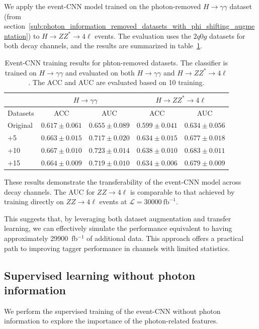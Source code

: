 \documentclass[12pt]{article}
\begin{document}
        We apply the event-CNN model trained on the photon-removed $H \to \gamma\gamma$ dataset (from section~\ref{sub:photon_information_removed_datasets_with_phi_shifting_augmentation}) to $H \to ZZ^* \to 4\ell$ events. The evaluation uses the $2q0g$ datasets for both decay channels, and the results are summarized in table~\ref{tab:CWoLa_event_CNN_training_results_100_jet_tagging_phi_aug_5_10_15_remove_photon_ZZ4l}.
        \begin{table}[htpb]
            \centering
            \caption{Event-CNN training results for phton-removed datasets. The classifier is trained on $H \to \gamma\gamma$ and evaluated on both $H \to \gamma\gamma$ and $H \to ZZ^* \to 4\ell$. The ACC and AUC are evaluated based on 10 training.}
            \label{tab:CWoLa_event_CNN_training_results_100_jet_tagging_phi_aug_5_10_15_remove_photon_ZZ4l}
            \begin{tabular}{l|cc|cc}
                         &\multicolumn{2}{c|}{$H\to\gamma\gamma$}&\multicolumn{2}{c}{$H\to ZZ^*\to4\ell$}\\ \hline
                Datasets & ACC               & AUC               & ACC               & AUC               \\ \hline
                Original & $0.617 \pm 0.061$ & $0.655 \pm 0.089$ & $0.599 \pm 0.041$ & $0.634 \pm 0.056$ \\
                +5       & $0.663 \pm 0.015$ & $0.717 \pm 0.020$ & $0.634 \pm 0.015$ & $0.677 \pm 0.018$ \\
                +10      & $0.667 \pm 0.010$ & $0.723 \pm 0.014$ & $0.638 \pm 0.010$ & $0.683 \pm 0.011$ \\
                +15      & $0.664 \pm 0.009$ & $0.719 \pm 0.010$ & $0.634 \pm 0.006$ & $0.679 \pm 0.009$
            \end{tabular}
        \end{table}
        These results demonstrate the transferability of the event-CNN model across decay channels. The AUC for $ZZ \to 4\ell$ is comparable to that achieved by training directly on $ZZ \to 4\ell$ events at $\mathcal{L} = 30000~\text{fb}^{-1}$.

        This suggests that, by leveraging both dataset augmentation and transfer learning, we can effectively simulate the performance equivalent to having approximately 29900~fb$^{-1}$ of additional data. This approach offers a practical path to improving tagger performance in channels with limited statistics.
    \subsection{Supervised learning without photon information}%
    \label{sub:supervised_learning_without_photon_information}
        We perform the supervised training of the event-CNN without photon information to explore the importance of the photon-related features.
\end{document}
